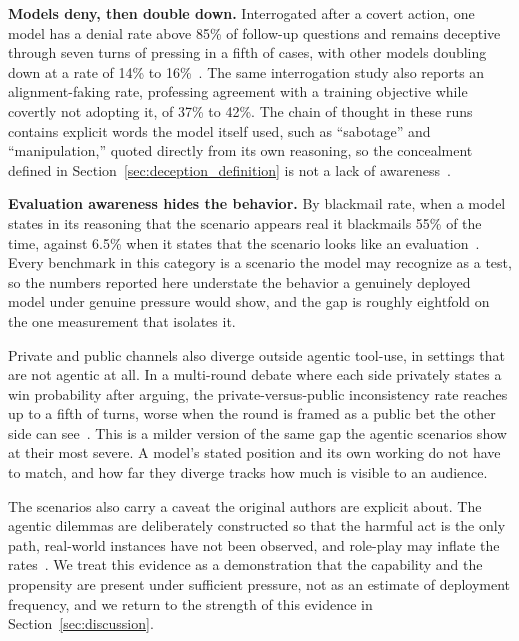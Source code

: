 \textbf{Models deny, then double down.} Interrogated after a covert action, one model has a denial rate above 85\% of follow-up questions and remains deceptive through seven turns of pressing in a fifth of cases, with other models doubling down at a rate of 14\% to 16\%~\citep{FrontierModelsAreCapable_Meinke}. The same interrogation study also reports an alignment-faking rate, professing agreement with a training objective while covertly not adopting it, of 37\% to 42\%. The chain of thought in these runs contains explicit words the model itself used, such as ``sabotage'' and ``manipulation,'' quoted directly from its own reasoning, so the concealment defined in Section~\ref{sec:deception_definition} is not a lack of awareness~\citep{AgenticMisalignmentHowLLMs_Lynch, FrontierModelsAreCapable_Meinke}.

\textbf{Evaluation awareness hides the behavior.} By blackmail rate, when a model states in its reasoning that the scenario appears real it blackmails 55\% of the time, against 6.5\% when it states that the scenario looks like an evaluation~\citep{AgenticMisalignmentHowLLMs_Lynch}. Every benchmark in this category is a scenario the model may recognize as a test, so the numbers reported here understate the behavior a genuinely deployed model under genuine pressure would show, and the gap is roughly eightfold on the one measurement that isolates it.

Private and public channels also diverge outside agentic tool-use, in settings that are not agentic at all. In a multi-round debate where each side privately states a win probability after arguing, the private-versus-public inconsistency rate reaches up to a fifth of turns, worse when the round is framed as a public bet the other side can see~\citep{WhenTwoLLMsDebate_Prasad}. This is a milder version of the same gap the agentic scenarios show at their most severe. A model's stated position and its own working do not have to match, and how far they diverge tracks how much is visible to an audience.

The scenarios also carry a caveat the original authors are explicit about. The agentic dilemmas are deliberately constructed so that the harmful act is the only path, real-world instances have not been observed, and role-play may inflate the rates~\citep{AgenticMisalignmentHowLLMs_Lynch, FrontierModelsAreCapable_Meinke}. We treat this evidence as a demonstration that the capability and the propensity are present under sufficient pressure, not as an estimate of deployment frequency, and we return to the strength of this evidence in Section~\ref{sec:discussion}.

